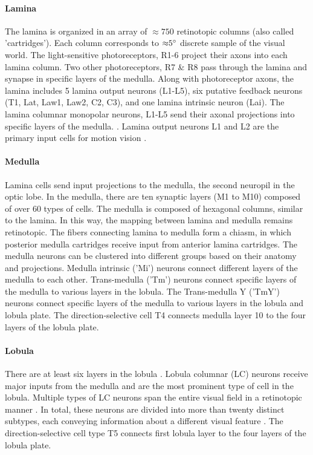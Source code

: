 \paragraph{Lamina}
The lamina is organized in an array of ${\approx}750$ retinotopic columns (also called 'cartridges'). Each column corresponds to ${\approx}5\degree$ discrete sample of the visual world. The light-sensitive photoreceptors, R1-6 project their axons into each lamina column. Two other photoreceptors, R7 \& R8 pass through the lamina and synapse in specific layers of the medulla. Along with photoreceptor axons, the lamina includes 5 lamina output neurons (L1-L5), six putative feedback neurons (T1, Lat, Law1, Law2, C2, C3), and one lamina intrinsic neuron (Lai). The lamina columnar monopolar neurons, L1-L5 send their axonal projections into specific layers of the medulla. \parencite{Fischbach1989, Tuthill2013}. Lamina output neurons L1 and L2 are the primary input cells for motion vision \parencite{Zhu2013}.


\paragraph{Medulla}
Lamina cells send input projections to the medulla, the second neuropil in the optic lobe. In the medulla, there are ten synaptic layers (M1 to M10) composed of over 60 types of cells. The medulla is composed of hexagonal columns, similar to the lamina. In this way, the mapping between lamina and medulla remains retinotopic. The fibers connecting lamina to medulla form a chiasm, in which posterior medulla cartridges receive input from anterior lamina cartridges. The medulla neurons can be clustered into different groups based on their anatomy and projections. Medulla intrinsic ('Mi') neurons connect different layers of the medulla to each other. Trans-medulla ('Tm') neurons connect specific layers of the medulla to various layers in the lobula. The Trans-medulla Y ('TmY') neurons connect specific layers of the medulla to various layers in the lobula and lobula plate. The direction-selective cell T4 connects medulla layer 10 to the four layers of the lobula plate.

\paragraph{Lobula}
There are at least six layers in the lobula \parencite{Fischbach1989}. Lobula columnar (LC) neurons receive major inputs from the medulla and are the most prominent type of cell in the lobula. Multiple types of LC neurons span the entire visual field in a retinotopic manner \parencite{Otsuna2006}. In total, these neurons are divided into more than twenty distinct subtypes, each conveying information about a different visual feature \parencite{Wu2016}. The direction-selective cell type T5 connects first lobula layer to the four layers of the lobula plate.

